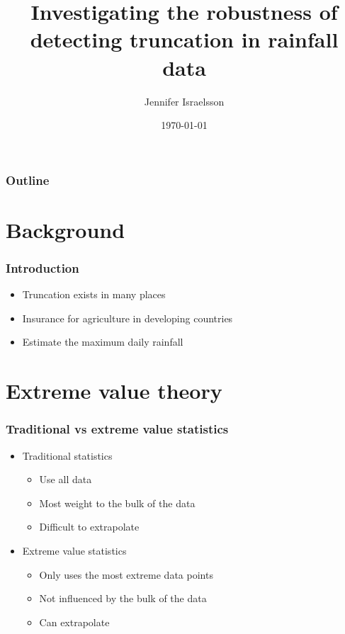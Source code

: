 \documentclass{beamer}
\title{Investigating the robustness of detecting truncation in rainfall data}
\author{Jennifer Israelsson}
\institute{University of Reading}
\date{\today}
\begin{document}
	\begin{frame}
	\titlepage
	\end{frame}

\begin{frame}
\frametitle{Outline}
\tableofcontents
\end{frame}

\section{Background}

\begin{frame}
\frametitle{Introduction}
\begin{itemize}
	\item Truncation exists in many places
	\item Insurance for agriculture in developing countries
	\item Estimate the maximum daily rainfall
\end{itemize}
\end{frame}

\section{Extreme value theory}

\begin{frame}
\frametitle{Traditional vs extreme value statistics}
\begin{itemize}
	\item Traditional statistics
		\begin{itemize}
			\item Use all data
			\item Most weight to the bulk of the data
			\item Difficult to extrapolate
		\end{itemize}
	\item Extreme value statistics
		\begin{itemize}
			\item Only uses the most extreme data points
			\item Not influenced by the bulk of the data 
			\item Can extrapolate
		\end{itemize}
\end{itemize}
\end{frame}
\end{document}
